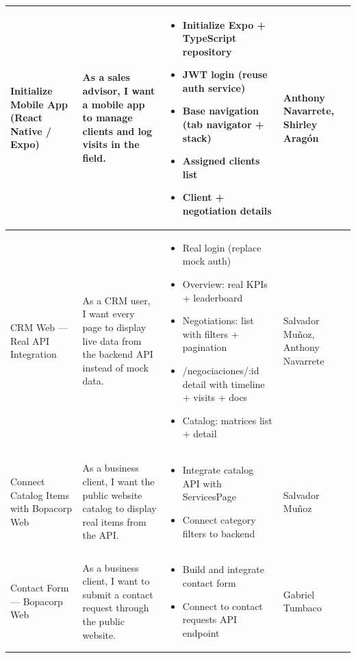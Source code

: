 \documentclass[letterpaper%
, oneside%
, 12pt%
, memoireprojet%
, english%
,creativecommons,hyperref, withAlgo2e %
]{thETS}
\begin{document}
\begin{longtable}{|p{3.2cm}|p{4.4cm}|p{5.4cm}|p{3.0cm}|}
Initialize Mobile App (React Native / Expo) & As a sales advisor, I want a mobile app to manage clients and log visits in the field. & \begin{itemize}\setlength{\itemsep}{2pt}
    \item Initialize Expo + TypeScript repository
    \item JWT login (reuse auth service)
    \item Base navigation (tab navigator + stack)
    \item Assigned clients list
    \item Client + negotiation details
\end{itemize} & Anthony Navarrete, Shirley Aragón \\ \hline

CRM Web — Real API Integration & As a CRM user, I want every page to display live data from the backend API instead of mock data. & \begin{itemize}\setlength{\itemsep}{2pt}
    \item Real login (replace mock auth)
    \item Overview: real KPIs + leaderboard
    \item Negotiations: list with filters + pagination
    \item /negociaciones/:id detail with timeline + visits + docs
    \item Catalog: matrices list + detail
\end{itemize} & Salvador Muñoz, Anthony Navarrete \\ \hline

Connect Catalog Items with Bopacorp Web & As a business client, I want the public website catalog to display real items from the API. & \begin{itemize}\setlength{\itemsep}{2pt}
    \item Integrate catalog API with ServicesPage
    \item Connect category filters to backend
\end{itemize} & Salvador Muñoz \\ \hline

Contact Form — Bopacorp Web & As a business client, I want to submit a contact request through the public website. & \begin{itemize}\setlength{\itemsep}{2pt}
    \item Build and integrate contact form
    \item Connect to contact requests API endpoint
\end{itemize} & Gabriel Tumbaco \\ \hline


\end{longtable}
\end{document}
